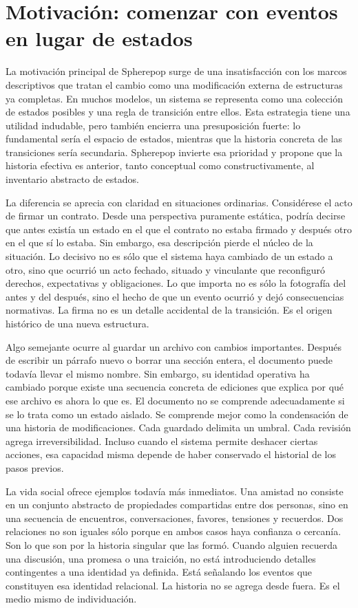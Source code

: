 \documentclass[12pt]{article}
\begin{document}
\section{Motivación: comenzar con eventos en lugar de estados}

La motivación principal de Spherepop surge de una insatisfacción con los marcos descriptivos que tratan el cambio como una modificación externa de estructuras ya completas. En muchos modelos, un sistema se representa como una colección de estados posibles y una regla de transición entre ellos. Esta estrategia tiene una utilidad indudable, pero también encierra una presuposición fuerte: lo fundamental sería el espacio de estados, mientras que la historia concreta de las transiciones sería secundaria. Spherepop invierte esa prioridad y propone que la historia efectiva es anterior, tanto conceptual como constructivamente, al inventario abstracto de estados.

La diferencia se aprecia con claridad en situaciones ordinarias. Considérese el acto de firmar un contrato. Desde una perspectiva puramente estática, podría decirse que antes existía un estado en el que el contrato no estaba firmado y después otro en el que sí lo estaba. Sin embargo, esa descripción pierde el núcleo de la situación. Lo decisivo no es sólo que el sistema haya cambiado de un estado a otro, sino que ocurrió un acto fechado, situado y vinculante que reconfiguró derechos, expectativas y obligaciones. Lo que importa no es sólo la fotografía del antes y del después, sino el hecho de que un evento ocurrió y dejó consecuencias normativas. La firma no es un detalle accidental de la transición. Es el origen histórico de una nueva estructura.

Algo semejante ocurre al guardar un archivo con cambios importantes. Después de escribir un párrafo nuevo o borrar una sección entera, el documento puede todavía llevar el mismo nombre. Sin embargo, su identidad operativa ha cambiado porque existe una secuencia concreta de ediciones que explica por qué ese archivo es ahora lo que es. El documento no se comprende adecuadamente si se lo trata como un estado aislado. Se comprende mejor como la condensación de una historia de modificaciones. Cada guardado delimita un umbral. Cada revisión agrega irreversibilidad. Incluso cuando el sistema permite deshacer ciertas acciones, esa capacidad misma depende de haber conservado el historial de los pasos previos.

La vida social ofrece ejemplos todavía más inmediatos. Una amistad no consiste en un conjunto abstracto de propiedades compartidas entre dos personas, sino en una secuencia de encuentros, conversaciones, favores, tensiones y recuerdos. Dos relaciones no son iguales sólo porque en ambos casos haya confianza o cercanía. Son lo que son por la historia singular que las formó. Cuando alguien recuerda una discusión, una promesa o una traición, no está introduciendo detalles contingentes a una identidad ya definida. Está señalando los eventos que constituyen esa identidad relacional. La historia no se agrega desde fuera. Es el medio mismo de individuación.
\end{document}
